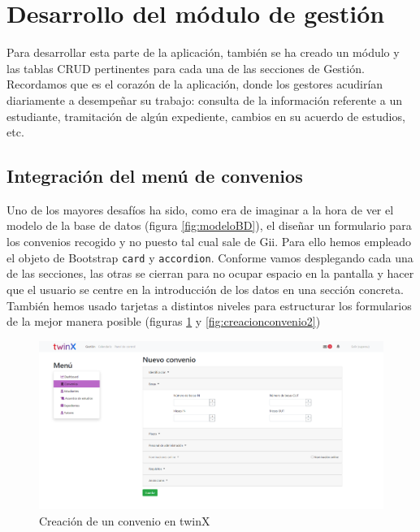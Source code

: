 \section{Desarrollo del módulo de gestión}
\label{sec:gestion}

Para desarrollar esta parte de la aplicación, también se ha creado un módulo y las tablas CRUD pertinentes para cada una de las secciones de Gestión. Recordamos que es el corazón de la aplicación, donde los gestores acudirían diariamente a desempeñar su trabajo: consulta de la información referente a un estudiante, tramitación de algún expediente, cambios en su acuerdo de estudios, etc.

\subsection{Integración del menú de convenios}

Uno de los mayores desafíos ha sido, como era de imaginar a la hora de ver el modelo de la base de datos (figura \ref{fig:modeloBD}), el diseñar un formulario para los convenios recogido y no puesto tal cual sale de Gii. Para ello hemos empleado el objeto de Bootstrap \texttt{card} y \texttt{accordion}. Conforme vamos desplegando cada una de las secciones, las otras se cierran para no ocupar espacio en la pantalla y hacer que el usuario se centre en la introducción de los datos en una sección concreta. También hemos usado tarjetas a distintos niveles para estructurar los formularios de la mejor manera posible (figuras \ref{fig:creacionconvenio1} y \ref{fig:creacionconvenio2})

\begin{figure}
	\centering
	\includegraphics[width=\textwidth]{img/Capturas de twinX/creacion_convenio_1}
	\caption{Creación de un convenio en twinX}
	\label{fig:creacionconvenio1}
\end{figure}

